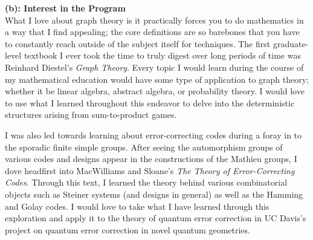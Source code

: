 \documentclass[11pt]{article}
\begin{document}


%
\noindent\textbf{(b): Interest in the Program}\\

What I love about graph theory is it practically forces you to do mathematics in a way that I find appealing; the core definitions are so barebones that you have to constantly reach outside of the subject itself for techniques. The first graduate-level textbook I ever took the time to truly digest over long periods of time was Reinhard Diestel's \emph{Graph Theory}. Every topic I would learn during the course of my mathematical education would have some type of application to graph theory; whether it be linear algebra, abstract algebra, or probability theory. I would love to use what I learned throughout this endeavor to delve into the deterministic structures arising from sum-to-product games.

I was also led towards learning about error-correcting codes during a foray in to the sporadic finite simple groups. After seeing the automorphism groups of various codes and designs appear in the constructions of the Mathieu groups, I dove headfirst into MacWilliams and Sloane's \emph{The Theory of Error-Correcting Codes}. Through this text, I learned the theory behind various combinatorial objects such as Steiner systems (and designs in general) as well as the Hamming and Golay codes. I would love to take what I have learned through this exploration and apply it to the theory of quantum error correction in UC Davis's project on quantum error correction in novel quantum geometries.\\
\end{document}
